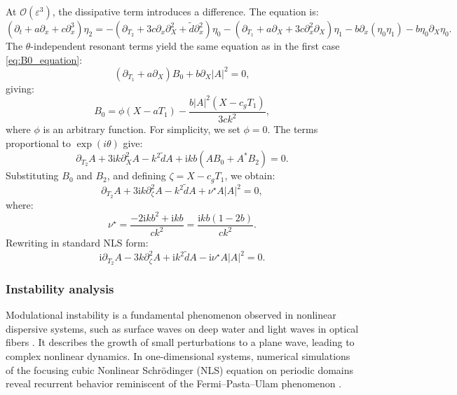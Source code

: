 \documentclass[alpha-refs, 12pt]{wiley-article}
\renewcommand{\O}{\mathcal{O}}
\newcommand{\ui}{\mathrm{i}}
\newcommand{\eps}{\varepsilon}
\begin{document}
At $\O(\eps^3)$, the dissipative term introduces a difference. The equation is:
\begin{equation}\label{eq:third_order_intermediate}
  \left( \partial_t + a \partial_x + c \partial_x^3 \right) \eta_2 = - \left( \partial_{T_2} + 3 c \partial_x \partial_X^2 + \tilde{d} \partial_x^2 \right) \eta_0 - \left( \partial_{T_1} + a \partial_X + 3 c \partial_x^2 \partial_X \right) \eta_1 - b \partial_x ( \eta_0 \eta_1 ) - b \eta_0 \partial_X \eta_0.
\end{equation}
The $\theta$-independent resonant terms yield the same equation as in the first case \eqref{eq:B0_equation}:
\[
  \left( \partial_{T_1} + a \partial_X \right) B_0 + b \partial_X |A|^2 = 0,
\]
giving:
\[
  B_0 = \phi(X - a T_1) - \frac{b |A|^2 (X - c_g T_1)}{3 c k^2},
\]
where $\phi$ is an arbitrary function. For simplicity, we set $\phi = 0$. The terms proportional to $\exp(i \theta)$ give:
\begin{equation}\label{eq:resonant_theta_intermediate}
  \partial_{T_2} A + 3 \ui k \partial_X^2 A - k^2 \tilde{d} A + \ui k b \left( A B_0 + A^* B_2 \right) = 0.
\end{equation}
Substituting $B_0$ and $B_2$, and defining $\zeta = X - c_g T_1$, we obtain:
\begin{equation*}%
  \partial_{T_2} A + 3 \ui k \partial_\zeta^2 A - k^2 \tilde{d} A + \nu^\star A |A|^2 = 0,
\end{equation*}
where:
\[
  \nu^\star = \frac{-2 \ui k b^2 + \ui k b}{c k^2} = \frac{\ui k b (1 - 2 b)}{c k^2}.
\]
Rewriting in standard NLS form:
\begin{equation}\label{eq:NLS_final_intermediate}
  \ui \partial_{T_2} A - 3 k \partial_\zeta^2 A + \ui k^2 \tilde{d} A - \ui \nu^\star A |A|^2 = 0.
\end{equation}

\subsubsection{Instability analysis}

Modulational instability is a fundamental phenomenon observed in nonlinear dispersive systems, such as surface waves on deep water \cite{Benjamin1967a, Yuen1975, Yuen1980, Remoissenet1996} and light waves in optical fibers \cite{Tai1986}. It describes the growth of small perturbations to a plane wave, leading to complex nonlinear dynamics. In one-dimensional systems, numerical simulations of the focusing cubic Nonlinear Schr\"odinger (NLS) equation on periodic domains reveal recurrent behavior reminiscent of the Fermi--Pasta--Ulam phenomenon \cite{Fermi1955, Yuen1978, Hafizi1981}.
\end{document}
